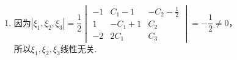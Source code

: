 \documentclass[12pt,fontset=fandol]{ctexart}
\begin{document}
\begin{solve}
\begin{enumerate}
\[\bar{B}=\begin{pmatrix}
                              A^2 & \xi_1
                          \end{pmatrix}=\begin{pmatrix}
                              2  & 2  & 0 & 1  \\
                              -2 & -2 & 0 & 1  \\
                              4  & 4  & 0 & -2
                          \end{pmatrix}
                          \rightarrow\begin{pmatrix}
                              1 & 1 & 0 & -\frac 12 \\
                              0 & 0 & 0 & 0         \\
                              0 & 0 & 0 & 0
                          \end{pmatrix}\]
，\\
                      则$A^2X=\xi_1$的通解\\
                      
\[\xi_3=C_2\begin{pmatrix}
                              -1 \\
                              1  \\
                              0
                          \end{pmatrix}+C_3\begin{pmatrix}
                              0 \\
                              0 \\
                              1
                          \end{pmatrix}+\begin{pmatrix}
                              -\frac 12 \\
                              0         \\
                              0
                          \end{pmatrix}=\begin{pmatrix}
                              -C_2 - \frac 12 \\
                              C_2             \\
                              C_3
                          \end{pmatrix}\]
（其中$C_2, C_3$为任意常数）.
                \item
                      因为$|\xi_1,\xi_2,\xi_3|=\dfrac 12\begin{vmatrix}
                              -1 & C_1 - 1  & -C_2 - \frac 12 \\
                              1  & -C_1 + 1 & C_2             \\
                              -2 & 2C_1     & C_3
                          \end{vmatrix}=-\dfrac 12\neq 0$，\\
                      所以$\xi_1,\xi_2,\xi_3$线性无关.
            \end{enumerate}
\end{solve}
\end{document}
